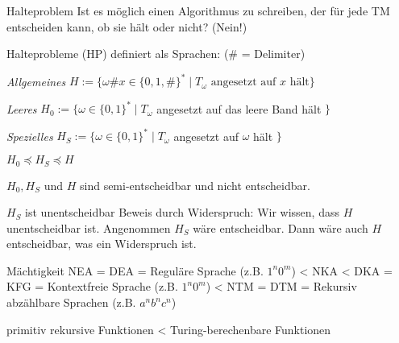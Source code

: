 \begin{concept}{Halteproblem}
    Ist es möglich einen Algorithmus zu schreiben, der für jede TM entscheiden kann, ob sie hält oder nicht? (Nein!)
    
    \vspace*{1mm}

    Halteprobleme (HP) definiert als Sprachen: {\small(\# = Delimiter)}

    \vspace*{1mm}

    \emph{Allgemeines} $H :=\{\omega \# x \in\{0,1, \#\}^{*} \mid T_{\omega} \text{ angesetzt auf } x \text{ hält} \}$

    \emph{Leeres} $H_{0}:=\{\omega \in\{0,1\}^{*} \mid T_{\omega}$ angesetzt auf das leere Band hält $\}$ 
    
    \emph{Spezielles} $H_{S}:=\{\omega \in\{0,1\}^{*} \mid T_{\omega}$ angesetzt auf $\omega$ hält $\}$

    \vspace*{1mm}

    {\small
    $H_{0} \preccurlyeq H_{S} \preccurlyeq H$

    $H_{0}, H_{S}$ und $H$ sind semi-entscheidbar und nicht entscheidbar.
    }
\end{concept}

\begin{example2}{$H_S$ ist unentscheidbar} Beweis durch Widerspruch: Wir wissen, dass $H$ unentscheidbar ist. Angenommen $H_S$ wäre entscheidbar. Dann wäre auch $H$ entscheidbar, was ein Widerspruch ist.
\end{example2}

\begin{KR}{Mächtigkeit}
    NEA = DEA = Reguläre Sprache (z.B. $1^n 0^m$) < NKA < DKA = KFG = Kontextfreie Sprache (z.B. $1^n 0^m$) < NTM = DTM  = Rekursiv abzählbare Sprachen (z.B. $a^n b^n c^n$)

    \vspace{1mm}

    primitiv rekursive Funktionen < Turing-berechenbare Funktionen
\end{KR}


